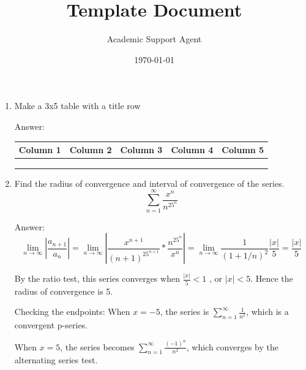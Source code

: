 \documentclass{article}
\title{Template Document}
\author{Academic Support Agent}
\date{\today}
\begin{document}
\maketitle

\maketitle

\begin{enumerate}
    \item 
Make a 3x5 table with a title row

Answer:
    \begin{table}[htbp]
        \centering
        \begin{tabular}{|c|c|c|c|c|}
        \hline
             Column 1 & Column 2 & Column 3 & Column 4 & Column 5\\
        \hline
                      &          &          &          &         \\
        \hline
                      &          &          &          &         \\
        \hline
                      &          &          &          &         \\
        \hline
        
        \end{tabular}
        \label{tab:my_label}
    \end{table}



    
\item
Find the radius of convergence and interval of convergence of the series.
    \begin{equation}
        \sum_{n=1}^{\infty} \frac{x^n}{n^25^n}
        \end{equation}
        
        Answer:
        $$ \lim_{n\to\infty} \left|\frac{a_{n+1}}{a_{n}}\right| = \lim_{n\to\infty}\left|\frac{x^{n+1}}{(n+1)^25^{n+1}}*\frac{n^25^n}{x^n}\right| = \lim_{n\to\infty} \frac{1}{(1+1/n)^2}\frac{|x|}{5} = \frac{|x|}{5}  $$
        
        By the ratio test, this series converges when $ \frac{|x|}{5}<1 $ , or $|x|<5$. Hence the radius of convergence is 5. 
        
        Checking the endpoints: When $x=-5$, the series is $\sum_{n=1}^{\infty} \frac{1}{n^2}$, which is a convergent p-series. 
        
        When $x=5$, the series becomes $\sum_{n=1}^{\infty} \frac{(-1)^n}{n^2}$, which converges by the alternating series test.
        




\end{enumerate}
\end{document}
